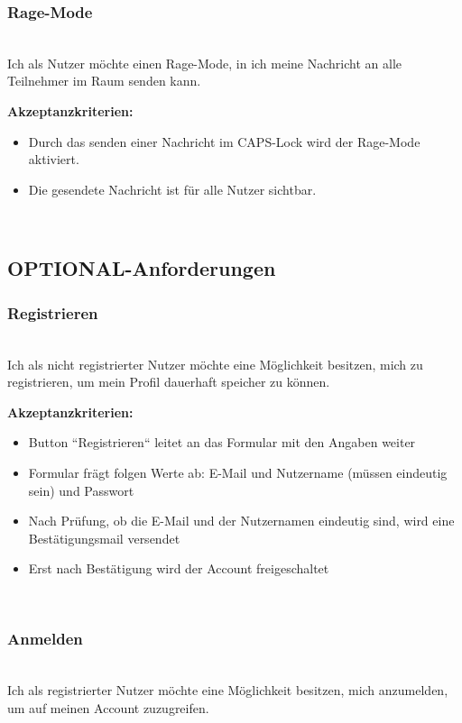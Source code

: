 \documentclass[conference]{IEEEtran}
\begin{document}
	\subsubsection{Rage-Mode}
	\ \\
	Ich als Nutzer möchte einen Rage-Mode, in ich meine Nachricht an alle Teilnehmer im Raum senden kann.
	
	\textbf{Akzeptanzkriterien:}
	\begin{itemize}
		\item Durch das senden einer Nachricht im CAPS-Lock wird der Rage-Mode aktiviert.
		\item Die gesendete Nachricht ist für alle Nutzer sichtbar.
	\end{itemize}
	

\ \\

	\subsection{OPTIONAL-Anforderungen}
	\subsubsection{Registrieren}
	\ \\
	Ich als nicht registrierter Nutzer möchte eine Möglichkeit besitzen, mich zu registrieren, um mein Profil dauerhaft speicher zu können.
	
	\textbf{Akzeptanzkriterien:}
	\begin{itemize}
		\item Button ``Registrieren`` leitet an das Formular mit den Angaben weiter
		\item Formular frägt folgen Werte ab: E-Mail und Nutzername (müssen eindeutig sein) und Passwort
		\item Nach Prüfung, ob die E-Mail und der Nutzernamen eindeutig sind, wird eine Bestätigungsmail versendet
		\item Erst nach Bestätigung wird der Account freigeschaltet
	\end{itemize}
	
	\ \\
	\subsubsection{Anmelden}
	\ \\
	Ich als registrierter Nutzer möchte eine Möglichkeit besitzen, mich anzumelden, um auf meinen Account zuzugreifen.
	
\end{document}
